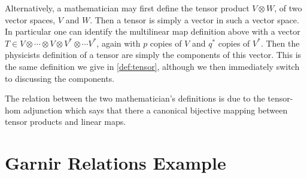 \documentclass[fleqn]{NotesClass}
\begin{document}
\begin{appendices}
        Alternatively, a mathematician may first define the tensor product \(V \otimes W\), of two vector spaces, \(V\) and \(W\).
        Then a tensor is simply a vector in such a vector space.
        In particular one can identify the multilinear map definition above with a vector \(T \in V \otimes \dotsb \otimes V \otimes V^* \otimes \dotsm V^*\), again with \(p\) copies of \(V\) and \(q^*\) copies of \(V^*\).
        Then the physicists definition of a tensor are simply the components of this vector.
        This is the same definition we give in \cref{def:tensor}, although we then immediately switch to discussing the components.
        
        The relation between the two mathematician's definitions is due to the tensor-hom adjunction which says that there a canonical bijective mapping between tensor products and linear maps.
        
        \chapter{Garnir Relations Example}\label{app:garnir example}

\end{appendices}
\end{document}
